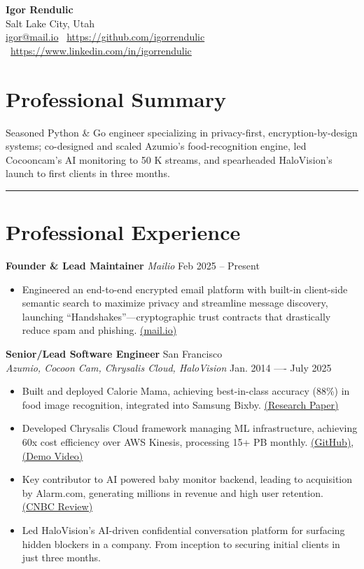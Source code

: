 \documentclass[11pt]{article}
\begin{document}
\begin{center}
  {\LARGE\bfseries Igor Rendulic}\\
  Salt Lake City, Utah\\
  \href{mailto:igor@mail.io}{igor@mail.io} \textbar\ 
  \href{https://github.com/igorrendulic}{https://github.com/igorrendulic} \textbar\ 
  \href{https://www.linkedin.com/in/igorrendulic}{https://www.linkedin.com/in/igorrendulic}
\end{center}

\section*{Professional Summary}
Seasoned Python \& Go engineer specializing in privacy-first, encryption-by-design systems; co-designed and scaled Azumio’s food-recognition engine, led Cocooncam’s AI monitoring to 50 K streams, and spearheaded HaloVision’s launch to first clients in three months.
\vspace{0.5em}
\hrule
\vspace{1em}

\section*{Professional Experience}
\textbf{Founder \& Lead Maintainer}
\textit{Mailio} \hfill Feb 2025 -- Present
\begin{itemize}
    \item Engineered an end-to-end encrypted email platform with built-in client-side semantic search to maximize privacy and streamline message discovery, launching “Handshakes”—cryptographic trust contracts that drastically reduce spam and phishing. \href{https://mail.io}{ (mail.io)}
\end{itemize}

\textbf{Senior/Lead Software Engineer} \hfill San Francisco\\
\textit{Azumio, Cocoon Cam, Chrysalis Cloud, HaloVision} \hfill Jan. 2014 ---- July 2025
\begin{itemize}
    \item Built and deployed Calorie Mama, achieving best-in-class accuracy (88\%) in food image recognition, integrated into Samsung Bixby. \href{https://www.mdpi.com/2072-6643/13/11/4132?type=check_update&version=2}{(Research Paper)}
    \item Developed Chrysalis Cloud framework managing ML infrastructure, achieving 60x cost efficiency over AWS Kinesis, processing 15+ PB monthly.  \href{https://github.com/igorrendulic/video-edge-ai-proxy}{(GitHub)}, \href{https://www.youtube.com/watch?v=bWCgTW2Ar5s}{(Demo Video)}
    \item Key contributor to AI powered baby monitor backend, leading to acquisition by Alarm.com, generating millions in revenue and high user retention. \href{https://www.cnbc.com/2018/06/13/cocoon-cam-review-a-smart-baby-monitor-that-detects-breathing.html}{(CNBC Review)}
    \item Led HaloVision’s AI-driven confidential conversation platform for surfacing hidden blockers in a company. From inception to securing initial clients in just three months.
\end{itemize}
\end{document}
